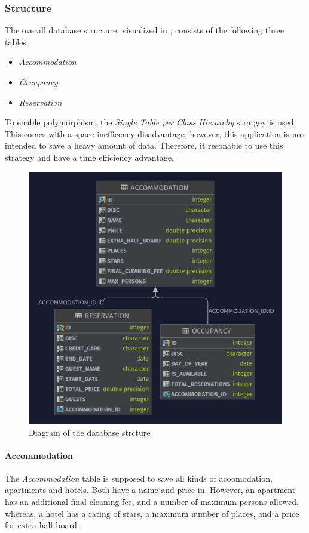 \subsubsection{Structure}\label{sec:02_design_db_structure}
The overall database structure, visualized in , consists of the following three tables:
\begin{itemize}
\item \textit{Accommodation}
\item \textit{Occupancy}
\item \textit{Reservation}
\end{itemize}
To enable polymorphism, the \textit{Single Table per Class Hierarchy} stratgey is used. This comes with a space inefficency  disadvantage, however, this application is not intended to save a heavy amount of data. Therefore, it resonable to use this strategy and have a time efficiency advantage. 

\begin{figure}[h]
\centering
\includegraphics[scale=0.3]{images/02_design/design-database}
\caption{Diagram of the database strcture}
\label{fig:02_design_db_structure_diagram}
\end{figure}

\paragraph{Accommodation}
The \textit{Accommodation} table is supposed to save all kinds of acoomodation, apartments and hotels. Both have a name and price in. However, an apartment has an additional final cleaning fee, and a number of maximum persons allowed, whereas, a hotel has a rating of stars, a maximum number of places, and a price for extra half-board.

